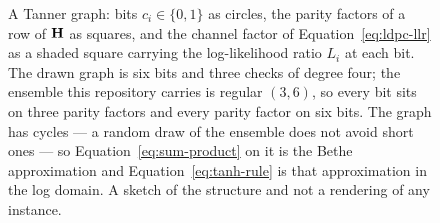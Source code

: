 \begin{figure}[htbp]
\centering
{}
\caption{A Tanner graph: bits $c_i \in \{0, 1\}$ as circles, the parity
factors of a row of $\mathbf{H}$ as squares, and the channel factor of
Equation~\ref{eq:ldpc-llr} as a shaded square carrying the log-likelihood
ratio $L_i$ at each bit. The drawn graph is six bits and three checks of
degree four; the ensemble this repository carries is regular $(3, 6)$, so
every bit sits on three parity factors and every parity factor on six bits.
The graph has cycles --- a random draw of the ensemble does not avoid short
ones --- so Equation~\ref{eq:sum-product} on it is the Bethe approximation
and Equation~\ref{eq:tanh-rule} is that approximation in the log domain. A
sketch of the structure and not a rendering of any instance.}
\label{fig:ldpc:sketch}
\end{figure}

